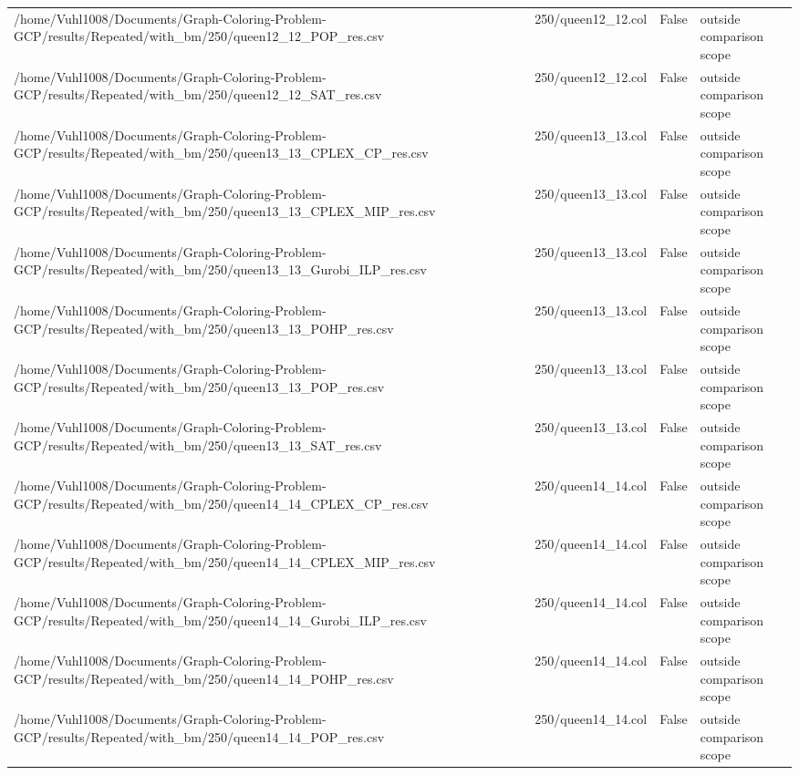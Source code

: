 \begin{table}[htbp]
\begin{tabular}{llll}
/home/Vuhl1008/Documents/Graph-Coloring-Problem-GCP/results/Repeated/with\_bm/250/queen12\_12\_POP\_res.csv & 250/queen12\_12.col & False & outside comparison scope \\
/home/Vuhl1008/Documents/Graph-Coloring-Problem-GCP/results/Repeated/with\_bm/250/queen12\_12\_SAT\_res.csv & 250/queen12\_12.col & False & outside comparison scope \\
/home/Vuhl1008/Documents/Graph-Coloring-Problem-GCP/results/Repeated/with\_bm/250/queen13\_13\_CPLEX\_CP\_res.csv & 250/queen13\_13.col & False & outside comparison scope \\
/home/Vuhl1008/Documents/Graph-Coloring-Problem-GCP/results/Repeated/with\_bm/250/queen13\_13\_CPLEX\_MIP\_res.csv & 250/queen13\_13.col & False & outside comparison scope \\
/home/Vuhl1008/Documents/Graph-Coloring-Problem-GCP/results/Repeated/with\_bm/250/queen13\_13\_Gurobi\_ILP\_res.csv & 250/queen13\_13.col & False & outside comparison scope \\
/home/Vuhl1008/Documents/Graph-Coloring-Problem-GCP/results/Repeated/with\_bm/250/queen13\_13\_POHP\_res.csv & 250/queen13\_13.col & False & outside comparison scope \\
/home/Vuhl1008/Documents/Graph-Coloring-Problem-GCP/results/Repeated/with\_bm/250/queen13\_13\_POP\_res.csv & 250/queen13\_13.col & False & outside comparison scope \\
/home/Vuhl1008/Documents/Graph-Coloring-Problem-GCP/results/Repeated/with\_bm/250/queen13\_13\_SAT\_res.csv & 250/queen13\_13.col & False & outside comparison scope \\
/home/Vuhl1008/Documents/Graph-Coloring-Problem-GCP/results/Repeated/with\_bm/250/queen14\_14\_CPLEX\_CP\_res.csv & 250/queen14\_14.col & False & outside comparison scope \\
/home/Vuhl1008/Documents/Graph-Coloring-Problem-GCP/results/Repeated/with\_bm/250/queen14\_14\_CPLEX\_MIP\_res.csv & 250/queen14\_14.col & False & outside comparison scope \\
/home/Vuhl1008/Documents/Graph-Coloring-Problem-GCP/results/Repeated/with\_bm/250/queen14\_14\_Gurobi\_ILP\_res.csv & 250/queen14\_14.col & False & outside comparison scope \\
/home/Vuhl1008/Documents/Graph-Coloring-Problem-GCP/results/Repeated/with\_bm/250/queen14\_14\_POHP\_res.csv & 250/queen14\_14.col & False & outside comparison scope \\
/home/Vuhl1008/Documents/Graph-Coloring-Problem-GCP/results/Repeated/with\_bm/250/queen14\_14\_POP\_res.csv & 250/queen14\_14.col & False & outside comparison scope \\

\end{tabular}
\end{table}
